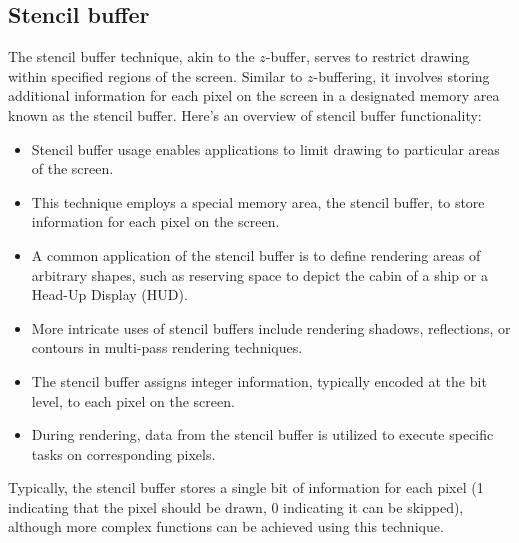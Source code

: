 \subsection{Stencil buffer}
The stencil buffer technique, akin to the $z$-buffer, serves to restrict drawing within specified regions of the screen. 
Similar to $z$-buffering, it involves storing additional information for each pixel on the screen in a designated memory area known as the stencil buffer.
Here's an overview of stencil buffer functionality:
\begin{itemize}
    \item Stencil buffer usage enables applications to limit drawing to particular areas of the screen.
    \item This technique employs a special memory area, the stencil buffer, to store information for each pixel on the screen.
    \item A common application of the stencil buffer is to define rendering areas of arbitrary shapes, such as reserving space to depict the cabin of a ship or a Head-Up Display (HUD).
    \item More intricate uses of stencil buffers include rendering shadows, reflections, or contours in multi-pass rendering techniques.
    \item The stencil buffer assigns integer information, typically encoded at the bit level, to each pixel on the screen.
    \item During rendering, data from the stencil buffer is utilized to execute specific tasks on corresponding pixels.
\end{itemize}
Typically, the stencil buffer stores a single bit of information for each pixel (1 indicating that the pixel should be drawn, 0 indicating it can be skipped), although more complex functions can be achieved using this technique.